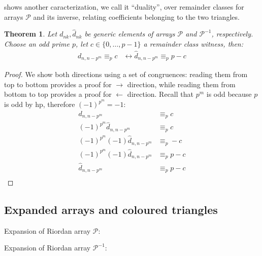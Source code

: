 \documentclass[11pt,a4paper]{article} %
\newtheorem{theorem}{Theorem}[section]
\begin{document}
    shows another caracterization, we call it ``duality'', 
    over remainder classes for arrays $\mathcal{P}$ and its inverse, relating coefficients
    belonging to the two triangles.
    \begin{theorem}
        Let $d_{nk}, \hat{d}_{nk}$ be generic elements of arrays $\mathcal{P}$ and $\mathcal{P}^{-1}$,
        respectively. Choose an odd prime $p$, let $c\in \lbrace 0, \ldots, p-1 \rbrace$ a remainder class
        witness, then:
        \begin{displaymath}
            \begin{split}
                d_{n,n-p^{m}} \equiv_{p} c &\leftrightarrow \hat{d}_{n,n-p^{m}} \equiv_{p} p-c
            \end{split}
        \end{displaymath}
    \end{theorem}
    \begin{proof}
    We show both directions using a set of congruences: reading them from top to bottom provides a 
    proof for $\rightarrow$ direction, while reading them from bottom to top provides a proof for 
    $\leftarrow$ direction. Recall that $p^m$ is odd because $p$ is odd by hp, therefore $(-1)^{p^m} = -1$:
    \begin{displaymath}
        \begin{split}
            d_{n,n-p^{m}} &\equiv_{p} c \\
            (-1)^{p^m}\hat{d}_{n,n-p^{m}} &\equiv_{p} c \\
            (-1)^{p^m }(-1)\hat{d}_{n,n-p^{m}} &\equiv_{p} -c \\
            (-1)^{p^m }(-1)\hat{d}_{n,n-p^{m}} &\equiv_{p} p -c \\
            \hat{d}_{n,n-p^{m}} &\equiv_{p} p -c \\
        \end{split}
    \end{displaymath}
    \end{proof}


    \subsection{Expanded arrays and coloured triangles}

    Expansion of Riordan array $\mathcal{P}$:
    
    Expansion of Riordan array $\mathcal{P}^{-1}$:
    
\end{document}
